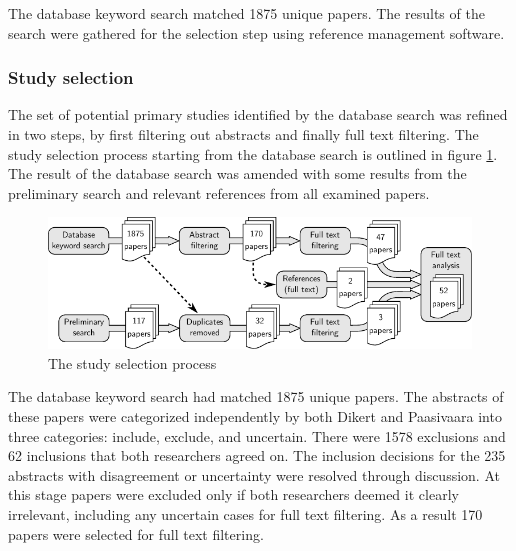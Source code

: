 \documentclass[preprint,authoryear,12pt]{elsarticle}
\begin{document}
The database keyword search matched 1875 unique papers. The results of the
search were gathered for the selection step using reference management software.


\subsubsection{Study selection}

The set of potential primary studies identified by the database search was
refined in two steps, by first filtering out abstracts and finally full text
filtering. The study selection process starting from the database search is
outlined in figure \ref{fig:selectionprocess_full}. The result of the database
search was amended with some results from the preliminary search and relevant
references from all examined papers.

\begin{figure}
  \begin{center}
    \includegraphics[width=1\textwidth]{graphics/research_process_full.pdf}
    \caption{The study selection process}
    \label{fig:selectionprocess_full}
  \end{center}
\end{figure}

The database keyword search had matched 1875 unique papers. The abstracts of
these papers were categorized independently by both Dikert and Paasivaara into
three categories: include, exclude, and uncertain. There were 1578 exclusions
and 62 inclusions that both researchers agreed on. The inclusion decisions
for the 235 abstracts with disagreement or uncertainty were resolved through
discussion. At this stage papers were excluded only if both researchers deemed
it clearly irrelevant, including any uncertain cases for full text filtering. As
a result 170 papers were selected for full text filtering.

%
%
%
%
%
%
\end{document}
